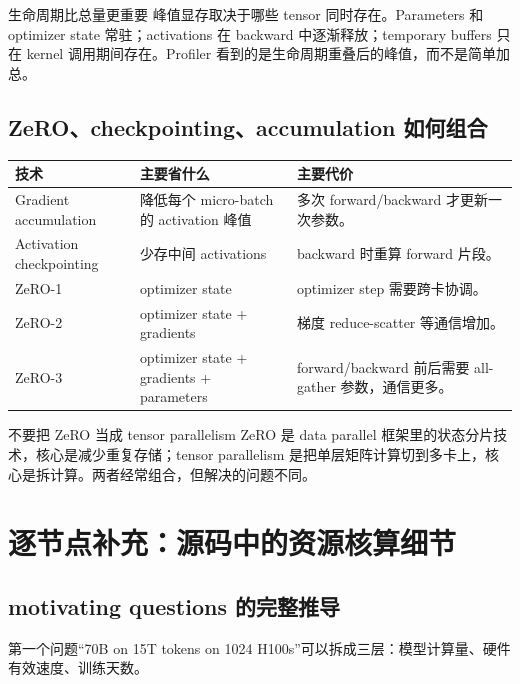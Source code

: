 \documentclass[a4paper]{article}
\begin{document}
\begin{knowledgebox}{生命周期比总量更重要}
峰值显存取决于哪些 tensor 同时存在。Parameters 和 optimizer state 常驻；activations 在 backward 中逐渐释放；temporary buffers 只在 kernel 调用期间存在。Profiler 看到的是生命周期重叠后的峰值，而不是简单加总。
\end{knowledgebox}

\subsection{ZeRO、checkpointing、accumulation 如何组合}

\begin{longtable}{p{}p{}p{}}
\toprule
\textbf{技术} & \textbf{主要省什么} & \textbf{主要代价} \\
\midrule
Gradient accumulation & 降低每个 micro-batch 的 activation 峰值 & 多次 forward/backward 才更新一次参数。 \\
Activation checkpointing & 少存中间 activations & backward 时重算 forward 片段。 \\
ZeRO-1 & optimizer state & optimizer step 需要跨卡协调。 \\
ZeRO-2 & optimizer state + gradients & 梯度 reduce-scatter 等通信增加。 \\
ZeRO-3 & optimizer state + gradients + parameters & forward/backward 前后需要 all-gather 参数，通信更多。 \\
\bottomrule
\end{longtable}

\begin{warningbox}{不要把 ZeRO 当成 tensor parallelism}
ZeRO 是 data parallel 框架里的状态分片技术，核心是减少重复存储；tensor parallelism 是把单层矩阵计算切到多卡上，核心是拆计算。两者经常组合，但解决的问题不同。
\end{warningbox}



\section{逐节点补充：源码中的资源核算细节}

\subsection{motivating questions 的完整推导}

第一个问题“70B on 15T tokens on 1024 H100s”可以拆成三层：模型计算量、硬件有效速度、训练天数。
\end{document}
